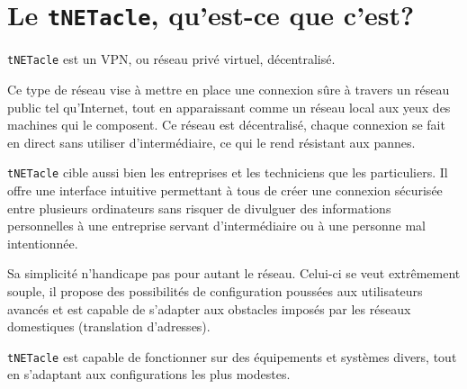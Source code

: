 ﻿\section{Le \texttt{tNETacle}, qu'est-ce que c'est?}
\texttt{tNETacle} est un VPN, ou réseau privé virtuel, décentralisé.

Ce type de réseau vise à mettre en place une connexion sûre à travers un réseau public tel qu'Internet, tout en apparaissant comme un réseau local aux yeux des machines qui le composent.
Ce réseau est décentralisé, chaque connexion se fait en direct sans utiliser d'intermédiaire, ce qui le rend résistant aux pannes.

\texttt{tNETacle} cible aussi bien les entreprises et les techniciens que les particuliers.
Il offre une interface intuitive permettant à tous de créer une connexion sécurisée entre plusieurs ordinateurs sans risquer de divulguer des informations personnelles à une entreprise servant d'intermédiaire ou à une personne mal intentionnée.

Sa simplicité n'handicape pas pour autant le réseau. Celui-ci se veut extrêmement souple, il propose des possibilités de configuration poussées aux utilisateurs avancés et est capable de s'adapter aux obstacles imposés par les réseaux domestiques (translation d'adresses).

\texttt{tNETacle} est capable de fonctionner sur des équipements et systèmes divers, tout en s'adaptant aux configurations les plus modestes.
